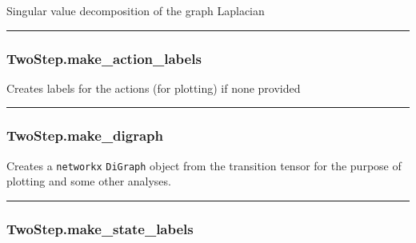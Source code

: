 \begin{Shaded}
\begin{Highlighting}[]
\NormalTok{)}
\end{Highlighting}
\end{Shaded}

Singular value decomposition of the graph Laplacian

\begin{center}\rule{0.5\linewidth}{\linethickness}\end{center}

\subsubsection{TwoStep.make\_action\_labels}\label{twostep.make_action_labels}

\begin{Shaded}
\begin{Highlighting}[]
\NormalTok{)}
\end{Highlighting}
\end{Shaded}

Creates labels for the actions (for plotting) if none provided

\begin{center}\rule{0.5\linewidth}{\linethickness}\end{center}

\subsubsection{TwoStep.make\_digraph}\label{twostep.make_digraph}

\begin{Shaded}
\begin{Highlighting}[]
\NormalTok{)}
\end{Highlighting}
\end{Shaded}

Creates a \texttt{networkx} \texttt{DiGraph} object from the transition
tensor for the purpose of plotting and some other analyses.

\begin{center}\rule{0.5\linewidth}{\linethickness}\end{center}

\subsubsection{TwoStep.make\_state\_labels}\label{twostep.make_state_labels}

